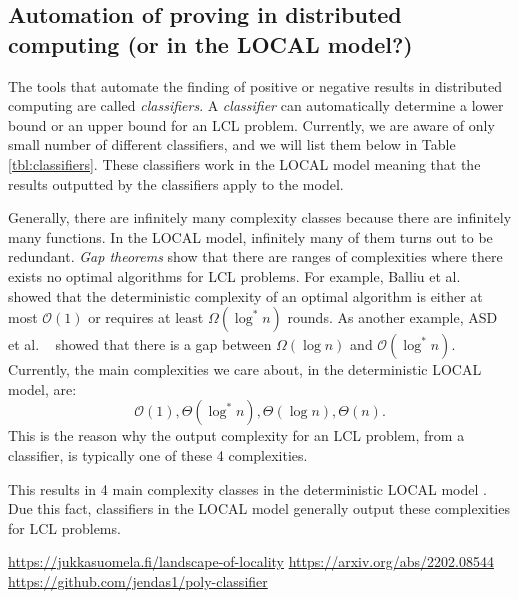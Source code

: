 
\subsection{Automation of proving in distributed computing (or in the LOCAL model?)} \label{sec:prior_work:automation_of_proving_in_dist_comp}


The tools that automate the finding of positive or negative results in distributed computing are called \emph{classifiers}.
A \emph{classifier} can automatically determine a lower bound or an upper bound for an LCL problem.
Currently, we are aware of only small number of different classifiers, and we will list them below in Table \ref{tbl:classifiers}.
These classifiers work in the LOCAL model meaning that the results outputted by the classifiers apply to the model. 

Generally, there are infinitely many complexity classes because there are infinitely many functions.
In the LOCAL model, infinitely many of them turns out to be redundant.
\emph{Gap theorems} show that there are ranges of complexities where there exists no optimal algorithms for LCL problems.
For example, Balliu et al.\ \cite{DBLP:conf/podc/BalliuHOS19} showed that the deterministic complexity of an optimal algorithm is either at most \(\mathcal{O}(1)\) or requires at least \(\Omega(\log^* n)\) rounds.
As another example, \todo{}ASD et al. \ \cite{} showed that there is a gap between \(\Omega(\log n)\) and \(\mathcal{O}(\log^* n)\).
Currently, the main complexities we care about, in the deterministic LOCAL model, are:
\[\mathcal{O}(1), \Theta(\log^* n), \Theta(\log n), \Theta(n).\]
This is the reason why the output complexity for an LCL problem, from a classifier, is typically one of these 4 complexities.

This results in 4 main complexity classes in the deterministic LOCAL model \cite{}.
Due this fact, classifiers in the LOCAL model generally output these complexities for LCL problems.


 \url{https://jukkasuomela.fi/landscape-of-locality}
\url{https://arxiv.org/abs/2202.08544}
\url{https://github.com/jendas1/poly-classifier}


